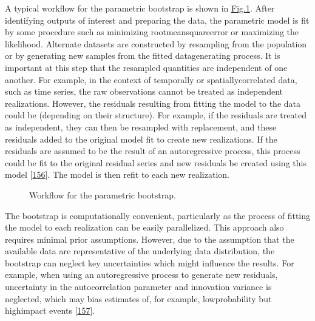 \documentclass[letterpaper,10pt,english]{sphinxmanual}
\let\sphinxpxdimen\pdfpxdimen\else\newdimen\sphinxpxdimen
\begin{document}
\sphinxAtStartPar
A typical workflow for the parametric bootstrap is shown in \hyperref[\detokenize{A1_Uncertainty_Quantification:figure-a1-2}]{Fig.\@ \ref{\detokenize{A1_Uncertainty_Quantification:figure-a1-2}}}. After identifying outputs of interest and preparing the data, the parametric model is fit by some procedure such as minimizing root\sphinxhyphen{}mean\sphinxhyphen{}square\sphinxhyphen{}error or maximizing the likelihood. Alternate datasets are constructed by resampling from the population or by generating new samples from the fitted data\sphinxhyphen{}generating process. It is important at this step that the resampled quantities are independent of one another. For example, in the context of temporally\sphinxhyphen{} or spatially\sphinxhyphen{}correlated data, such as time series, the raw observations cannot be treated as independent realizations. However, the residuals resulting from fitting the model to the data could be (depending on their structure). For example, if the residuals are treated as independent, they can then be resampled with replacement, and these residuals added to the original model fit to create new realizations. If the residuals are assumed to be the result of an autoregressive process, this process could be fit to the original residual series and new residuals be created using this model {[}\hyperlink{cite.index:id35}{156}{]}. The model is then refit to each new realization.

\begin{figure}[htbp]
\centering
\capstart

\noindent\sphinxincludegraphics[width=700\sphinxpxdimen]{{figureA1_2_bootstrap_workflow}.png}
\caption{Workflow for the parametric bootstrap.}\label{\detokenize{A1_Uncertainty_Quantification:id14}}\label{\detokenize{A1_Uncertainty_Quantification:figure-a1-2}}\end{figure}

\sphinxAtStartPar
The bootstrap is computationally convenient, particularly as the process of fitting the model to each realization can be easily parallelized. This approach also requires minimal prior assumptions. However, due to the assumption that the available data are representative of the underlying data distribution, the bootstrap can neglect key uncertainties which might influence the results. For example, when using an autoregressive process to generate new residuals, uncertainty in the autocorrelation parameter and innovation variance is neglected, which may bias estimates of, for example, low\sphinxhyphen{}probability but high\sphinxhyphen{}impact events {[}\hyperlink{cite.index:id36}{157}{]}.
\end{document}
